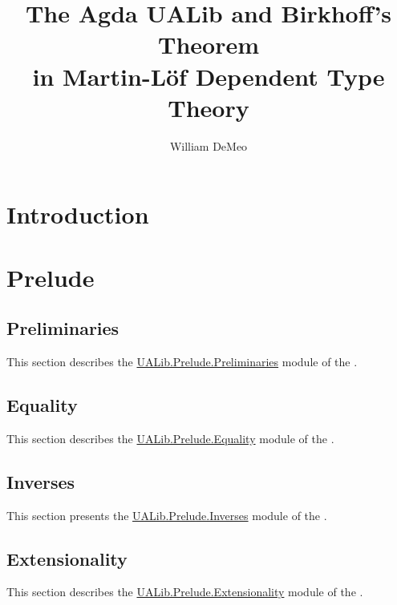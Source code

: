 \documentclass[a4paper,UKenglish,cleveref, autoref, thm-restate]{lipics-v2021}
\title{The Agda UALib and Birkhoff's Theorem\\ in Martin-L\"of Dependent Type Theory}
\author{William DeMeo}
       {Department of Algebra, Charles University in Prague \and \url{https://williamdemeo.gitlab.io}}
       {williamdemeo@gmail.com}
       {https://orcid.org/0000-0003-1832-5690}
       {}
\begin{document}
\maketitle

\begin{abstract}

\end{abstract}

\setcounter{tocdepth}{2}
\tableofcontents

\newpage

\section{Introduction}\label{sec:introduction}



\newpage

\section{Prelude}\label{sec:prelude}

\subsection{Preliminaries}\label{sec:preliminaries}
This section describes the \href{}{UALib.Prelude.Preliminaries} module of the \agdaualib.


\subsection{Equality}\label{sec:equality}
This section describes the \href{}{UALib.Prelude.Equality} module of the \agdaualib.


\subsection{Inverses}\label{sec:inverses}
This section presents the \href{}{UALib.Prelude.Inverses} module of the \agdaualib.


\subsection{Extensionality}\label{sec:extensionality}
This section describes the \href{}{UALib.Prelude.Extensionality} module of the \agdaualib.

\end{document}
